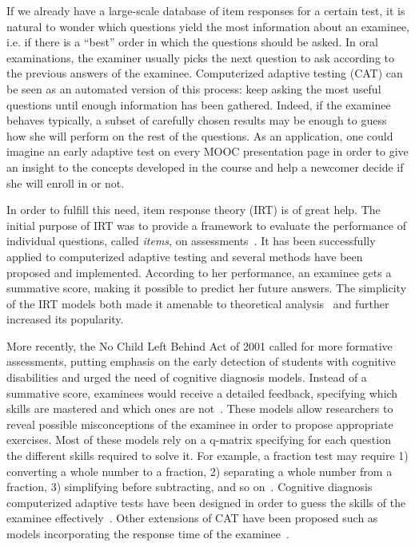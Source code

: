 \documentclass{edm_template}
\begin{document}
If we already have a large-scale database of item responses for a certain test, it is natural to wonder which questions yield the most information about an examinee, i.e. if there is a ``best'' order in which the questions should be asked. In oral examinations, the examiner usually picks the next question to ask according to the previous answers of the examinee. Computerized adaptive testing (CAT) can be seen as an automated version of this process: keep asking the most useful questions until enough information has been gathered. Indeed, if the examinee behaves typically, a subset of carefully chosen results may be enough to guess how she will perform on the rest of the questions. As an application, one could imagine an early adaptive test on every MOOC presentation page in order to give an insight to the concepts developed in the course and help a newcomer decide if she will enroll in or not.

In order to fulfill this need, item response theory (IRT) is of great help. The initial purpose of IRT was to provide a framework to evaluate the performance of individual questions, called \emph{items}, on assessments~\cite{Hambleton1991}. It has been successfully applied to computerized adaptive testing and several methods have been proposed and implemented. According to her performance, an examinee gets a summative score, making it possible to predict her future answers. The simplicity of the IRT models both made it amenable to theoretical analysis~\cite{Baker2004} and further increased its popularity.

More recently, the No Child Left Behind Act of 2001 called for more formative assessments, putting emphasis on the early detection of students with cognitive disabilities and urged the need of cognitive diagnosis models. Instead of a summative score, examinees would receive a detailed feedback, specifying which skills are mastered and which ones are not~\cite{Cheng2009}. These models allow researchers to reveal possible misconceptions of the examinee in order to propose appropriate exercises. Most of these models rely on a q-matrix specifying for each question the different skills required to solve it. For example, a fraction test may require 1) converting a whole number to a fraction, 2) separating a whole number from a fraction, 3) simplifying before subtracting, and so on~\cite{DeLaTorreDouglas2004}. Cognitive diagnosis computerized adaptive tests have been designed in order to guess the skills of the examinee effectively~\cite{Cheng2009}. Other extensions of CAT have been proposed such as models incorporating the response time of the examinee~\cite{Chang2014}.
\end{document}
